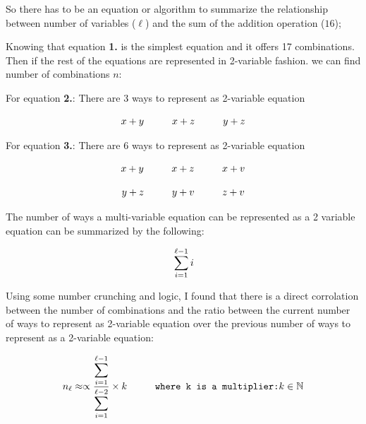 \documentclass[fleqn, a4paper,12pt]{article}
\begin{document}
So there has to be an equation or algorithm to summarize the relationship between number of variables ($\ell$) and the sum of the addition operation ($16$);

Knowing that equation \textbf{1.} is the simplest equation and it offers 17 combinations. Then if the rest of the equations are represented in 2-variable fashion. we can find number of combinations $n$:

For equation \textbf{2.}: There are 3 ways to represent as 2-variable equation
\begin{center}
\[
\hspace*{\fill} x + y \hspace{1cm} x + z \hspace{1cm} y + z \hspace*{\fill}
\]
\end{center}

For equation \textbf{3.}: There are 6 ways to represent as 2-variable equation
\begin{center}
\[
\hspace*{\fill} x + y \hspace{1cm} x + z \hspace{1cm} x + v \hspace*{\fill}
\]
\end{center}
\begin{center}
\[
\hspace*{\fill} y + z \hspace{1cm} y + v \hspace{1cm} z + v \hspace*{\fill}
\]
\end{center}

The number of ways a multi-variable equation can be represented as a 2 variable equation can be summarized by the following:

\[
\\ \sum_{i=1}^{\ell-1} i
\]

Using some number crunching and logic, I found that there is a direct corrolation between the number of combinations and the ratio between the current number of ways to represent as 2-variable equation over the previous number of ways to represent as a 2-variable equation:

\[
		\\ n_\ell \approx \propto \frac{\displaystyle \sum_{i=1}^{\ell-1}}{\displaystyle \sum_{i=1}^{\ell-2}} \times k \hspace{1cm} \texttt{where k is a multiplier:} k \in \mathbb{N} 
\]
\end{document}

